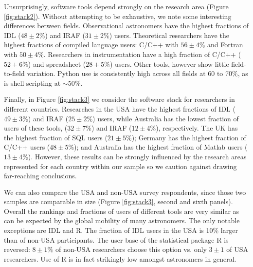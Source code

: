 Unsurprisingly, software tools depend strongly on the research area (Figure \ref{fig:stack2}). Without attempting to be exhaustive, we note some interesting differences between fields. Observational astronomers have the highest fractions of IDL ($48\pm2\%$) and IRAF ($31\pm2\%$) users. Theoretical researchers have the highest fractions of compiled language users: C/C++ with $56\pm4\%$ and Fortran with $50\pm4\%$. Researchers in instrumentation have a high fraction of C/C++ ($52\pm6\%$) and spreadsheet ($28\pm5\%$) users. Other tools, however show little field-to-field variation. Python use is consistently high across all fields at 60 to 70\%, as is shell scripting at $\sim50\%$. 

Finally, in Figure \ref{fig:stack3} we consider the software stack for researchers in different countries. Researches in the USA have the highest fractions of IDL ($49\pm3\%$) and IRAF ($25\pm2\%$) users, while Australia has the lowest fraction of users of these tools, ($32\pm7\%$) and IRAF ($12\pm4\%$), respectively. The UK has the highest fraction of SQL users ($21\pm5\%$); Germany has the highest fraction of C/C++ users ($48\pm5\%$); and Australia has the highest fraction of Matlab users ($13\pm4\%$). However, these results can be strongly influenced by the research areas represented for each country within our sample so we caution against drawing far-reaching conclusions. 

We can also compare the USA and non-USA survey respondents, since those two samples are comparable in size (Figure \ref{fig:stack3}, second and sixth panels). Overall the rankings and fractions of users of different tools are very similar as can be expected by the global mobility of many astronomers. The only notable exceptions are IDL and R. The fraction of IDL users in the USA is 10\% larger than of non-USA participants. The user base of the statistical package R is reversed:  $8\pm1\%$ of non-USA researchers choose this option vs. only $3\pm1$ of USA researchers. Use of R is in fact strikingly low amongst astronomers in general.
    